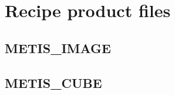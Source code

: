 \section{Recipe product files}
\label{sec:recipe_products}

\subsection{METIS\_IMAGE}
\label{ssec:METIS_IMAGE}

\subsection{METIS\_CUBE}
\label{ssec:METIS_CUBE}


